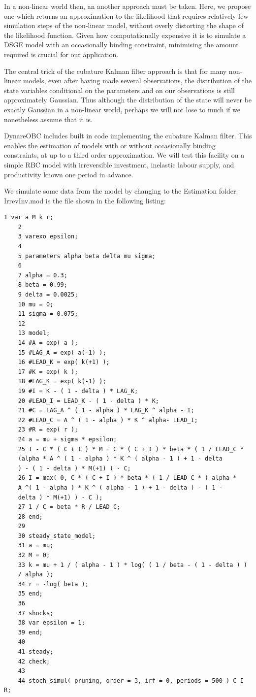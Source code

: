 \documentclass[10pt,math=newtx,citestyle=gb7714-2015,bibstyle=gb7714-2015]{elegantbook}
\begin{document}
{In a non-linear world then, an another approach must be taken. Here, we propose one which returns an approximation to the likelihood that requires relatively few simulation steps of the non-linear model, without overly distorting the shape of the likelihood function. Given how computationally expensive
it is to simulate a DSGE model with an occasionally binding constraint, minimising the amount required is crucial for our application.

The central trick of the cubature Kalman filter approach is that for many non-linear models, even after having made several observations, the distribution of the state variables conditional on the parameters and on our observations is still approximately Gaussian. Thus although the distribution of the
state will never be exactly Gaussian in a non-linear world, perhaps we will not lose to much if we nonetheless assume that it is.

DynareOBC includes built in code implementing the cubature Kalman filter. This enables the estimation of models with or without occasionally binding constraints, at up to a third order approximation. We will test this facility on a simple RBC model with irreversible investment, inelastic labour supply, and productivity known one period in advance.

We simulate some data from the model by changing to the Estimation folder. IrrevInv.mod is the file shown in the following listing:

\begin{lstlisting}[frame=shadowbox]
	1 var a M k r;
	2 
	3 varexo epsilon;
	4 
	5 parameters alpha beta delta mu sigma;
	6
	7 alpha = 0.3;
	8 beta = 0.99;
	9 delta = 0.0025;
	10 mu = 0;
	11 sigma = 0.075;
	12
	13 model;
	14 #A = exp( a );
	15 #LAG_A = exp( a(-1) );
	16 #LEAD_K = exp( k(+1) );
	17 #K = exp( k );
	18 #LAG_K = exp( k(-1) );
	19 #I = K - ( 1 - delta ) * LAG_K;
	20 #LEAD_I = LEAD_K - ( 1 - delta ) * K;
	21 #C = LAG_A ^ ( 1 - alpha ) * LAG_K ^ alpha - I;
	22 #LEAD_C = A ^ ( 1 - alpha ) * K ^ alpha- LEAD_I;
	23 #R = exp( r );
	24 a = mu + sigma * epsilon;
	25 I - C * ( C + I ) * M = C * ( C + I ) * beta * ( 1 / LEAD_C * 
	(alpha * A ^ ( 1 - alpha ) * K ^ ( alpha - 1 ) + 1 - delta
	) - ( 1 - delta ) * M(+1) ) - C;
	26 I = max( 0, C * ( C + I ) * beta * ( 1 / LEAD_C * ( alpha *
	A ^( 1 - alpha ) * K ^ ( alpha - 1 ) + 1 - delta ) - ( 1 -
	delta ) * M(+1) ) - C );
	27 1 / C = beta * R / LEAD_C;
	28 end;
	29
	30 steady_state_model;
	31 a = mu;
	32 M = 0;
	33 k = mu + 1 / ( alpha - 1 ) * log( ( 1 / beta - ( 1 - delta ) )
	/ alpha );
	34 r = -log( beta );
	35 end;
	36
	37 shocks;
	38 var epsilon = 1;
	39 end;
	40
	41 steady;
	42 check;
	43
	44 stoch_simul( pruning, order = 3, irf = 0, periods = 500 ) C I R;
\end{lstlisting}

}
\end{document}
